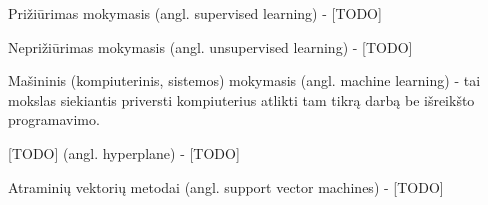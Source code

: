 Prižiūrimas mokymasis (angl. supervised learning) - [TODO]

Neprižiūrimas mokymasis (angl. unsupervised learning) - [TODO]

Mašininis\cite{mamcenko08} (kompiuterinis, sistemos\cite{martisiute08})
mokymasis (angl. machine learning) - tai mokslas siekiantis priversti
kompiuterius atlikti tam tikrą darbą be išreikšto programavimo.
\begin{comment}
Machine learning is the science of getting computers to act without being
explicitly programmed.
\end{comment}

[TODO] (angl. hyperplane) - [TODO]

Atraminių vektorių metodai (angl. support vector machines) - [TODO]